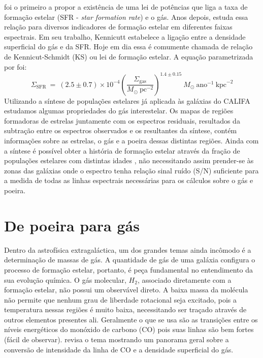 \citet{Schmidt.1959a} foi o primeiro a propor a existência de uma lei de potências que liga a taxa
de formação estelar (SFR - {\em star formation rate}) e o gás. Anos depois, \citet{Kennicutt.1998a}
estuda essa relação para diversos indicadores de formação estelar em diferentes faixas espectrais.
Em seu trabalho, Kennicutt estabelece a ligação entre a densidade superficial do gás e da SFR. Hoje
em dia essa é comumente chamada de relação de Kennicut-Schmidt (KS) ou lei de formação estelar. A
equação parametrizada por \citeauthor{Kennicutt.1998a} foi:
\begin{equation}
	\Sigma_{\mathrm{SFR}}\ =\ (2.5\pm0.7)\times 10^{-4} \left(\frac{\Sigma_{\mathrm{gas}}}{
M_\odot\ \mathrm{pc}^{-2}}\right)^{1.4 \pm 0.15}\ M_\odot\ \mathrm{ano}^{-1}\ \mathrm{kpc}^{-2}
	\label{eq:SFRKennicutt}
\end{equation}
\noindent Utilizando a síntese de populações estelares já aplicada às galáxias do CALIFA estudamos
algumas propriedades do gás interestelar. Os mapas de regiões formadoras de estrelas juntamente com
os espectros residuais, resultados da subtração entre os espectros observados e os resultantes da
síntese, contém informações sobre as estrelas, o gás e a poeira dessas distintas regiões. Ainda com
a síntese é possível obter a história de formação estelar através da fração de populações estelares
com distintas idades \citep{Asari.etal.2007a}, não necessitando assim prender-se às zonas das
galáxias onde o espectro tenha relação sinal ruído (S/N) suficiente para a medida de todas as linhas
espectrais necessárias para os cálculos sobre o gás e poeira.

\section{De poeira para gás}
\label{sec:intro:dust2gas}

Dentro da astrofísica extragaláctica, um dos grandes temas ainda incômodo é a determinação de massas
de gás. A quantidade de gás de uma galáxia configura o processo de formação estelar, portanto, é
peça fundamental no entendimento da sua evolução química. O gás molecular, $H_2$, associado
diretamente com a formação estelar, não possui um observável direto. A baixa massa da molécula não
permite que nenhum grau de liberdade rotacional seja excitado, pois a temperatura nessas regiões é
muito baixa, necessitando ser traçado através de outros elementos presentes ali.
Geralmente o que se usa são as transições entre os níveis energéticos do monóxido de carbono (CO)
pois suas linhas são bem fortes (fácil de observar). \citep{Bolatto.etal.2013a} revisa o tema
mostrando um panorama geral sobre a conversão de intensidade da linha de CO e a densidade
superficial do gás.

